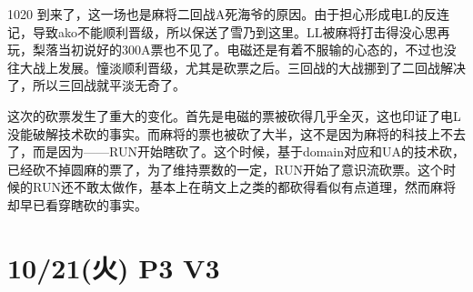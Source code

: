 
1020 到来了，这一场也是麻将二回战A死海爷的原因。由于担心形成电L的反连记，导致ako不能顺利晋级，所以保送了雪乃到这里。LL被麻将打击得没心思再玩，梨落当初说好的300A票也不见了。电磁还是有着不服输的心态的，不过也没往大战上发展。憧淡顺利晋级，尤其是砍票之后。三回战的大战挪到了二回战解决了，所以三回战就平淡无奇了。

这次的砍票发生了重大的变化。首先是电磁的票被砍得几乎全灭，这也印证了电L没能破解技术砍的事实。而麻将的票也被砍了大半，这不是因为麻将的科技上不去了，而是因为——RUN开始瞎砍了。这个时候，基于domain对应和UA的技术砍，已经砍不掉圆麻的票了，为了维持票数的一定，RUN开始了意识流砍票。这个时候的RUN还不敢太做作，基本上在萌文上之类的都砍得看似有点道理，然而麻将却早已看穿瞎砍的事实。

\section{10/21(火) P3 V3}



